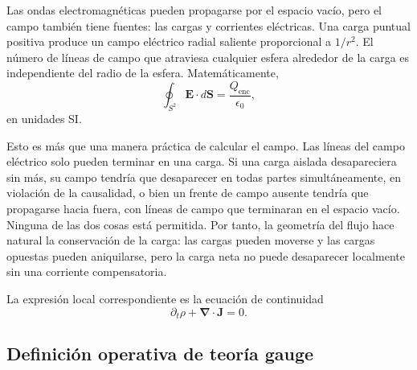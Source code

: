 Las ondas electromagnéticas pueden propagarse por el espacio vacío, pero el campo también tiene fuentes: las cargas y corrientes eléctricas. Una carga puntual positiva produce un campo eléctrico radial saliente proporcional a \(1/r^2\). El número de líneas de campo que atraviesa cualquier esfera alrededor de la carga es independiente del radio de la esfera. Matemáticamente,
\begin{equation}
\oint_{S^2}\boldsymbol E\cdot d\boldsymbol S
=\frac{Q_{\mathrm{enc}}}{\epsilon_0},
\label{eq:l5-gauss}
\end{equation}
en unidades SI.

Esto es más que una manera práctica de calcular el campo. Las líneas del campo eléctrico solo pueden terminar en una carga. Si una carga aislada desapareciera sin más, su campo tendría que desaparecer en todas partes simultáneamente, en violación de la causalidad, o bien un frente de campo ausente tendría que propagarse hacia fuera, con líneas de campo que terminaran en el espacio vacío. Ninguna de las dos cosas está permitida. Por tanto, la geometría del flujo hace natural la conservación de la carga: las cargas pueden moverse y las cargas opuestas pueden aniquilarse, pero la carga neta no puede desaparecer localmente sin una corriente compensatoria.

La expresión local correspondiente es la ecuación de continuidad
\begin{equation}
\partial_t\rho+\boldsymbol\nabla\cdot\boldsymbol J=0.
\label{eq:l5-continuity}
\end{equation}

\subsection{Definición operativa de teoría gauge}

